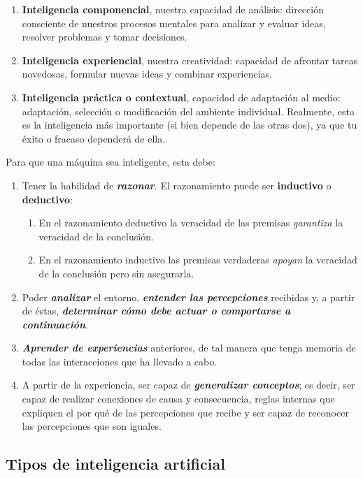 \begin{enumerate}
    \item \textbf{Inteligencia componencial}, nuestra capacidad de análisis: dirección consciente de nuestros procesos mentales para analizar y evaluar ideas, resolver problemas y tomar decisiones.
    \item \textbf{Inteligencia experiencial}, nuestra creatividad: capacidad de afrontar tareas novedosas, formular nuevas ideas y combinar experiencias.
    \item \textbf{Inteligencia práctica o contextual}, capacidad de adaptación al medio: adaptación, selección o modificación del ambiente individual. Realmente, esta es la inteligencia más importante (si bien depende de las otras dos), ya que tu éxito o fracaso  dependerá de ella. 
\end{enumerate}


Para que una máquina sea inteligente, esta debe: 

\begin{enumerate}
    \item Tener la habilidad de \textbf{\textit{razonar}}. El razonamiento puede ser \textbf{inductivo} o \textbf{deductivo}:
        \begin{enumerate}
            \item En el razonamiento deductivo la veracidad de las premisas \textit{garantiza} la veracidad de la conclusión.
            \item En el razonamiento inductivo las premisas verdaderas \textit{apoyan} la veracidad de la conclusión pero sin asegurarla.
        \end{enumerate}
    \item Poder \textbf{\textit{analizar}} el entorno, \textbf{\textit{entender las percepciones}} recibidas y, a partir de éstas, \textbf{\textit{determinar cómo debe actuar o comportarse a continuación}}.
    \item \textbf{\textit{Aprender de experiencias}} anteriores, de tal manera que tenga memoria de todas las interacciones que ha llevado a cabo.
    \item A partir de la experiencia, ser capaz de \textbf{\textit{generalizar conceptos}}; es decir, ser capaz de realizar conexiones de causa y consecuencia, reglas internas que expliquen el por qué de las percepciones que recibe y ser capaz de reconocer las percepciones que son iguales.
\end{enumerate}

\subsection{Tipos de inteligencia artificial}

